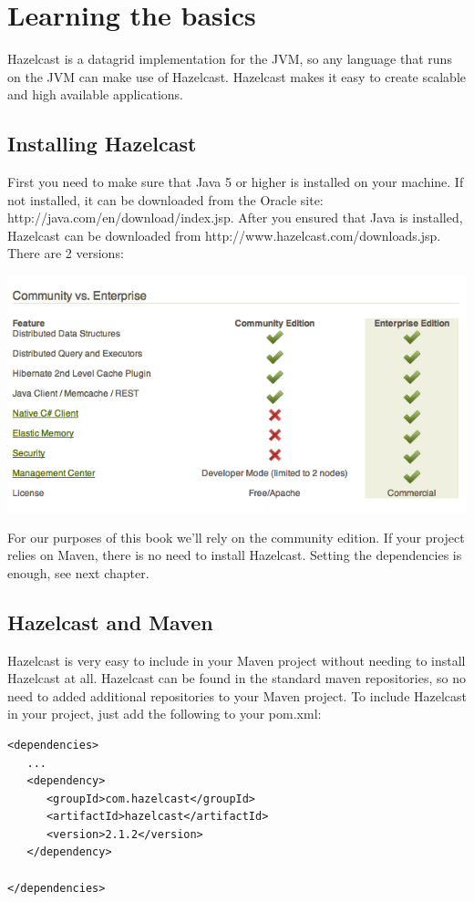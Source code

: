 \chapter{Learning the basics}
Hazelcast is a datagrid implementation for the JVM, so any language that runs on the JVM can make use of Hazelcast. Hazelcast makes it easy to create scalable and high available applications.

\section{Installing Hazelcast}

First you need to make sure that Java 5 or higher is installed on your machine. If not installed, it can be downloaded from the Oracle site:
http://java.com/en/download/index.jsp. After you ensured that Java is installed, Hazelcast can be downloaded from http://www.hazelcast.com/downloads.jsp. There are 2 versions:

\includegraphics[scale=0.60]{hazelcast-editions.png}

For our purposes of this book we'll rely on the community edition. If your project relies on Maven, there is no need to install Hazelcast. Setting the dependencies is enough, see next chapter.

\section{Hazelcast and Maven}

Hazelcast is very easy to include in your Maven project without needing to install Hazelcast at all.  Hazelcast can be found in the standard maven repositories, so no need to added additional repositories to your Maven project. To include Hazelcast in your project, just add the following to your pom.xml:

\begin{verbatim}
<dependencies>	
   ...
   <dependency>
      <groupId>com.hazelcast</groupId>
      <artifactId>hazelcast</artifactId>
      <version>2.1.2</version>
   </dependency>

</dependencies>
\end{verbatim}	

